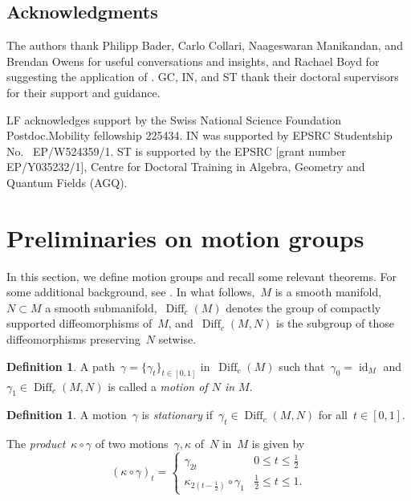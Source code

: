 \documentclass{amsart}
\theoremstyle{definition}
\theoremstyle{definition}
\theoremstyle{definition}
\theoremstyle{definition}
\newtheorem{definition}[theorem]{Definition}
\DeclareMathOperator{\id}{id}
\newcommand{\diff}{\operatorname{Diff}} %
\begin{document}
\subsection*{Acknowledgments}
The authors thank Philipp Bader, Carlo Collari, Naageswaran Manikandan, and Brendan Owens for useful conversations and insights, and Rachael Boyd for suggesting the application of \cite[Theorem A]{Boyd-Bregman}. GC, IN, and ST thank their doctoral supervisors for their support and guidance.

LF acknowledges support by the Swiss National Science Foundation Postdoc.Mobility fellowship 225434. IN was supported by EPSRC Studentship No. ~EP/W524359/1. ST is supported by the EPSRC [grant number EP/Y035232/1], Centre for Doctoral Training in Algebra, Geometry and Quantum Fields (AGQ).





\section{Preliminaries on motion groups}\label{section:prelim_motion_groups}

In this section, we define motion groups and recall some relevant theorems. For some additional background, see \cite{Goldsmith, Boyd-Bregman}. In what follows,~$M$ is a smooth manifold,~$N\subset M$ a smooth submanifold,~$\diff_c(M)$ denotes the group of compactly supported diffeomorphisms of~$M$, and~$\diff_c(M, N)$ is the subgroup of those diffeomorphisms preserving~$N$ setwise.

\begin{definition}\label{def:smooth motion}
    A path~$\gamma = \{\gamma_t\}_{t \in [0,1]}$ in~$\diff_c(M)$ such that~$\gamma_0 = \id_M$ and~$\gamma_1 \in \diff_c(M, N)$ is called a \emph{motion of $N$ in $M$}.  
\end{definition}


\begin{definition}\label{def:stationary_motion}
A motion~$\gamma$ is \emph{stationary} if~$\gamma_t \in \diff_c(M, N)$ for all~$t \in [0, 1]$.
\end{definition}

The \emph{product}~$\kappa \circ \gamma$ of two motions~$\gamma, \kappa$ of~$N$ in~$M$ is given by
\begin{equation*}
    (\kappa \circ \gamma)_t =
    \begin{cases}
        \gamma_{2t} & 0 \leq t \leq \frac{1}{2} \\
        \kappa_{2(t-\frac{1}{2})} \circ \gamma_1 & \frac{1}{2} \leq t \leq 1.
    \end{cases}
\end{equation*}
\end{document}
